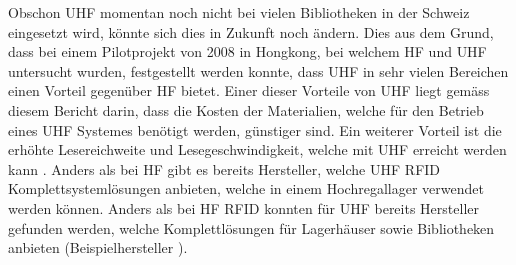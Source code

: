 Obschon \gls{UHF} momentan noch nicht bei vielen Bibliotheken in der Schweiz eingesetzt wird, könnte sich dies in Zukunft noch ändern. Dies aus dem Grund, dass bei einem Pilotprojekt von 2008 in Hongkong, bei welchem \gls{HF} und \gls{UHF} untersucht wurden, festgestellt werden konnte, dass \gls{UHF} in sehr vielen Bereichen einen Vorteil gegenüber \gls{HF} bietet. Einer dieser Vorteile von \gls{UHF} liegt gemäss diesem Bericht darin, dass die Kosten der Materialien, welche für den Betrieb eines \gls{UHF} Systemes benötigt werden, günstiger sind. Ein weiterer Vorteil ist die erhöhte Lesereichweite und Lesegeschwindigkeit, welche mit \gls{UHF} erreicht werden kann \parencite{rfidHfVsUhf}. Anders als bei \gls{HF} gibt es bereits Hersteller, welche \gls{UHF} \gls{RFID} Komplettsystemlösungen anbieten, welche in einem Hochregallager verwendet werden können. Anders als bei \gls{HF} \gls{RFID} konnten für \gls{UHF} bereits Hersteller gefunden werden, welche Komplettlösungen für Lagerhäuser sowie Bibliotheken anbieten (Beispielhersteller \cite{litumRFID}).
